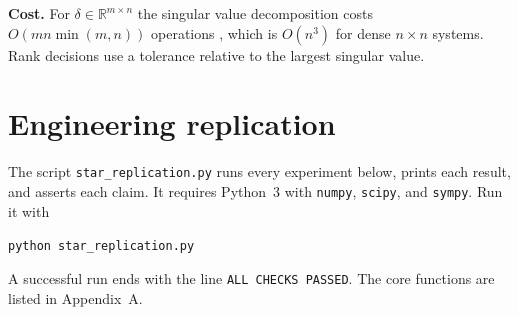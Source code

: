 \documentclass[11pt,letterpaper]{article}
\theoremstyle{plain}
\theoremstyle{definition}
\theoremstyle{remark}
\newcommand{\R}{\mathbb{R}}
\begin{document}
\textbf{Cost.} For $\delta\in\R^{m\times n}$ the singular value decomposition costs $O(mn\min(m,n))$ operations \cite{golub}, which is $O(n^{3})$ for dense $n\times n$ systems. Rank decisions use a tolerance relative to the largest singular value.

\section{Engineering replication}\label{sec:replication}

The script \texttt{star\_replication.py} runs every experiment below, prints each result, and asserts each claim. It requires Python~3 with \texttt{numpy}, \texttt{scipy}, and \texttt{sympy}. Run it with
\begin{center}\texttt{python star\_replication.py}\end{center}
A successful run ends with the line \texttt{ALL CHECKS PASSED}. The core functions are listed in Appendix~A.
\end{document}
